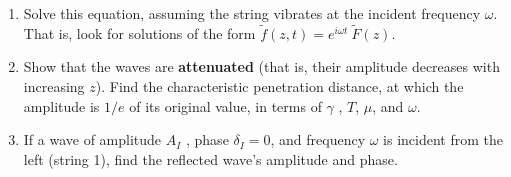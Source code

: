 \documentclass[fleqn]{article}
\begin{document}
\begin{enumerate}
\begin{enumerate}
      \item Solve this equation, assuming the string vibrates at the incident frequency $\omega$. That is, look for solutions of the
      form $\tilde{f}(z,t)=e^{i \omega t} ~ \tilde{F}(z)$.


      \item Show that the waves are \textbf{attenuated} (that is, their amplitude decreases with increasing $z$). Find the characteristic penetration distance, at which the amplitude
      is $1/e$ of its original value, in terms of $\gamma$ , $T$, $\mu$, and $\omega$.


      \item If a wave of amplitude $A_I$ , phase $\delta_I=0$, and frequency $\omega$ is incident from the left (string 1), find the reflected wave’s
      amplitude and phase.


    \end{enumerate}


  \end{enumerate}
\end{document}
